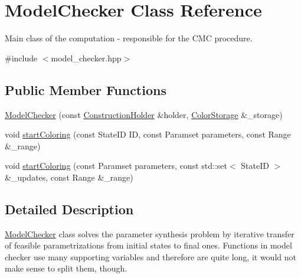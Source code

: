 \hypertarget{classModelChecker}{\section{\-Model\-Checker \-Class \-Reference}
\label{classModelChecker}
}


\-Main class of the computation -\/ responsible for the \-C\-M\-C procedure.  




{\ttfamily \#include $<$model\-\_\-checker.\-hpp$>$}

\subsection*{\-Public \-Member \-Functions}
\begin{DoxyCompactItemize}
\item 
\hyperlink{classModelChecker_af27cb475a7aa17cc378e6dbd0d55eb6b}{\-Model\-Checker} (const \hyperlink{classConstructionHolder}{\-Construction\-Holder} \&holder, \hyperlink{classColorStorage}{\-Color\-Storage} \&\-\_\-storage)
\item 
void \hyperlink{classModelChecker_a647ede3601153d3ce66a46c99673b3cd}{start\-Coloring} (const \-State\-I\-D \-I\-D, const \-Paramset parameters, const \-Range \&\-\_\-range)
\item 
void \hyperlink{classModelChecker_a532cf29476539edd24925204650ef1dc}{start\-Coloring} (const \-Paramset parameters, const std\-::set$<$ \-State\-I\-D $>$ \&\-\_\-updates, const \-Range \&\-\_\-range)
\end{DoxyCompactItemize}


\subsection{\-Detailed \-Description}
\hyperlink{classModelChecker}{\-Model\-Checker} class solves the parameter synthesis problem by iterative transfer of feasible parametrizations from initial states to final ones. \-Functions in model checker use many supporting variables and therefore are quite long, it would not make sense to split them, though. 

